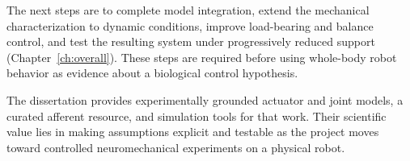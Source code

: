 The next steps are to complete model integration, extend the mechanical characterization to dynamic conditions, improve load-bearing and balance control, and test the resulting system under progressively reduced support (Chapter~\ref{ch:overall}). These steps are required before using whole-body robot behavior as evidence about a biological control hypothesis.

The dissertation provides experimentally grounded actuator and joint models, a curated afferent resource, and simulation tools for that work. Their scientific value lies in making assumptions explicit and testable as the project moves toward controlled neuromechanical experiments on a physical robot.


